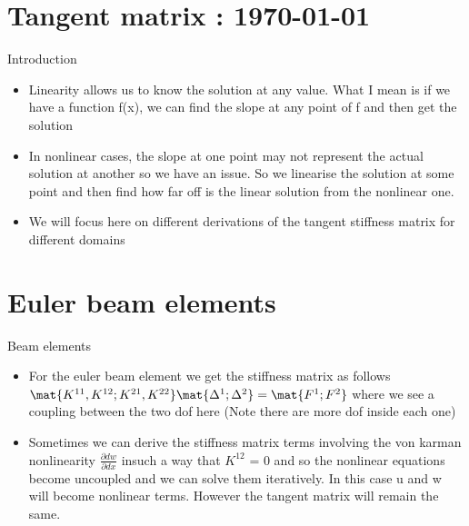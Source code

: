 




	\tableofcontents

\section{Tangent matrix : \today}
	\begin{frame}{Introduction}
		\begin{itemize}
			\item Linearity allows us to know the solution at any value. What I mean is if we have a function f(x), we can find the slope at any point of f and then get the solution
			\item In nonlinear cases, the slope at one point may not represent the actual solution at another so we have an issue. So we linearise the solution at some point and then find how far off is the linear solution from the nonlinear one. 
			\item We will focus here on different derivations of the tangent stiffness matrix for different domains	
		\end{itemize}
	\end{frame}
		
\section{Euler beam elements}		
	\begin{frame}{Beam elements}
		\begin{itemize}
			\item For the euler beam element we get the stiffness matrix as follows  \\
			$\mat{K^{11},K^{12} ; K^{21},K^{22}} \mat{\Delta^1 ; \Delta^2} = \mat{F^1 ; F^2}$
			where we see a coupling between the two dof here (Note there are more dof inside each one)
			\item Sometimes we can derive the stiffness matrix terms involving the von karman nonlinearity $ \frac{\partial dw}{\partial dx}$ insuch a way that $K^{12}$ = 0 and so the nonlinear equations become uncoupled and we can solve them iteratively. In this case u and w will become nonlinear terms. 
			However the tangent matrix will remain the same.
		\end{itemize}
	\end{frame}	

